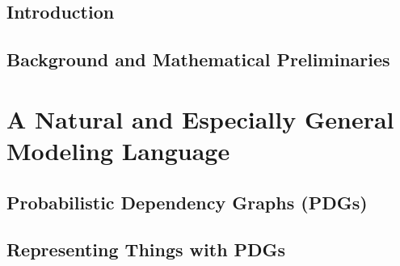 \documentclass[tocprelim,
    ]{cornellmodified}
\begin{document}
\contentspage
\figurelistpage

\normalspacing \setcounter{page}{1} 
\pagestyle{cornell} \addtolength{\parskip}{0.5\baselineskip}


\chapter{Introduction}
    
\chapter{Background and Mathematical Preliminaries}
    

\part{A Natural and Especially General Modeling Language}
    \label{part:univ-model}

\chapter{Probabilistic Dependency Graphs (PDGs)} 
    
    
\chapter{Representing Things with PDGs}
    
     
\end{document}

